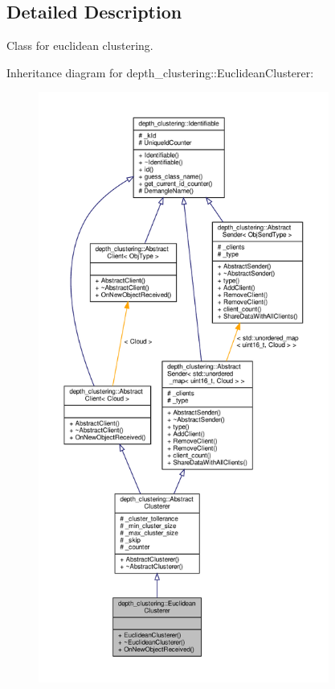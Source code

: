 \subsection{Detailed Description}
Class for euclidean clustering. 

Inheritance diagram for depth\+\_\+clustering\+:\+:Euclidean\+Clusterer\+:\nopagebreak
\begin{figure}[H]
\begin{center}
\leavevmode
\includegraphics[height=550pt]{classdepth__clustering_1_1EuclideanClusterer__inherit__graph}
\end{center}
\end{figure}


